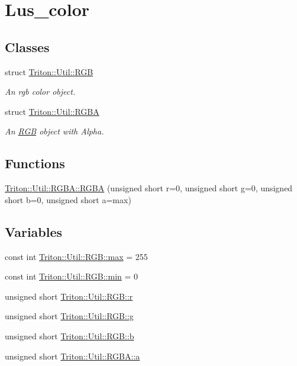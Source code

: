 \hypertarget{group__lus__color}{}\section{Lus\+\_\+color}
\label{group__lus__color}
\subsection*{Classes}
\begin{DoxyCompactItemize}
\item 
struct \hyperlink{struct_triton_1_1_util_1_1_r_g_b}{Triton\+::\+Util\+::\+R\+G\+B}
\begin{DoxyCompactList}\small\item\em An rgb color object. \end{DoxyCompactList}\item 
struct \hyperlink{struct_triton_1_1_util_1_1_r_g_b_a}{Triton\+::\+Util\+::\+R\+G\+B\+A}
\begin{DoxyCompactList}\small\item\em An \hyperlink{struct_triton_1_1_util_1_1_r_g_b}{R\+G\+B} object with Alpha. \end{DoxyCompactList}\end{DoxyCompactItemize}
\subsection*{Functions}
\begin{DoxyCompactItemize}
\item 
\hyperlink{group__lus__color_gad6fd5c4030e3b57842ca2b371e460e78}{Triton\+::\+Util\+::\+R\+G\+B\+A\+::\+R\+G\+B\+A} (unsigned short r=0, unsigned short g=0, unsigned short b=0, unsigned short a=max)
\end{DoxyCompactItemize}
\subsection*{Variables}
\begin{DoxyCompactItemize}
\item 
const int \hyperlink{group__lus__color_ga25c01b9de0c18136b41333c426c2b226}{Triton\+::\+Util\+::\+R\+G\+B\+::max} = 255
\item 
const int \hyperlink{group__lus__color_gaf4323053c0ecc091d206864ca2bbd26e}{Triton\+::\+Util\+::\+R\+G\+B\+::min} = 0
\item 
unsigned short \hyperlink{group__lus__color_ga1fcfba2ad564a76d12f72f4b7441b3dc}{Triton\+::\+Util\+::\+R\+G\+B\+::r}
\item 
unsigned short \hyperlink{group__lus__color_ga595248e981b342dfdeb08dc85f190229}{Triton\+::\+Util\+::\+R\+G\+B\+::g}
\item 
unsigned short \hyperlink{group__lus__color_gadac238b0db4b4534cfa592331234b403}{Triton\+::\+Util\+::\+R\+G\+B\+::b}
\item 
unsigned short \hyperlink{group__lus__color_ga91997be3ade022a459176810c8d2b777}{Triton\+::\+Util\+::\+R\+G\+B\+A\+::a}
\end{DoxyCompactItemize}


